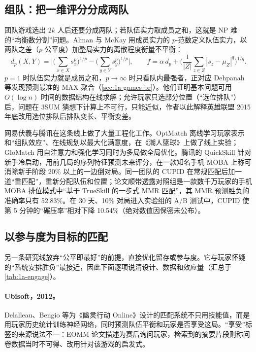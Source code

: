 \subsection{组队：把一维评分分成两队}\label{sec:1a-mm-team}

团队游戏选出 $2k$ 人后还要分成两队；若队伍实力取成员之和，这就是 NP 难的“均衡数分割”问题\cite{wang2024enmatch}\tagLit。Alman 与 McKay 用成员实力的 $p$-范数定义队伍实力，以两队之差（$p$-公平度）加整局实力的离散程度衡量不平衡\cite{alman2017theoretical}\tagLit：
\begin{equation}\label{eq:1a-alman}
  d_p(X,Y)=\Big|\Big(\sum_{x\in X}s_x^p\Big)^{1/p}-\Big(\sum_{y\in Y}s_y^p\Big)^{1/p}\Big|,\qquad
  f=\alpha\,d_p+\Big(\frac{1}{|Z|}\sum_{z\in Z}|s_z-\mu_Z|^q\Big)^{1/q}.
\end{equation}
$p=1$ 时队伍实力就是成员之和，$p\to\infty$ 时只看队内最强者，正对应 Dehpanah 等发现预测最准的 MAX 聚合（\cref{sec:1a-games-br}）。他们证明基本问题可用 $O(\log n)$ 时间的数据结构在线求解；允许玩家只选部分位置（“选位排队”）后，问题在 3SUM 猜想下计算上不可行，只能近似，作者以此解释英雄联盟 2015 年底改用选位排队后排队变长、平衡变差。

网易伏羲与腾讯在这条线上做了大量工程化工作。OptMatch 离线学习玩家表示和“组队效应”、在线规划以最大化满意度，在《潮人篮球》上做了线上实验\cite{gong2020optmatch}\tagLit{}；GloMatch 用自注意力和强化学习同时为多局做全局优化\cite{deng2021globally}\tagLit\needcheck[；只读到其他论文的描述]。腾讯的 QuickSkill 针对新手冷启动，用前几局的序列特征预测未来评分，在一款知名手机 MOBA 上称可消除新手阶段 20\% 以上的一边倒对局\cite{zhang2022quickskill}\tagLit。同一团队的 CUPID 在常规匹配后加一道“重匹配”，重新分配队伍和位置\cite{fan2024cupid}\tagLit；论文顺带透露对照组是一款数千万玩家的手机 MOBA 排位模式中“基于 TrueSkill 的一步式 MMR 匹配”，其 MMR 预测胜负的准确率只有 52.83\%。在 30 天、10\% 对局进入实验组的 A/B 测试中，CUPID 使第 5 分钟的“碾压率”相对下降 10.54\%（绝对数值因保密未公布）。

\subsection{以参与度为目标的匹配}\label{sec:1a-mm-engage}

另一条研究线放弃“公平即最好”的前提，直接优化留存或参与度。它与玩家怀疑的“系统安排胜负”最接近，因此下面逐项说清设计、数据和效应量（汇总于\cref{tab:1a-engage}）。

\paragraph{Ubisoft，2012。}Delalleau、Bengio 等为《幽灵行动 Online》设计的匹配系统不只用技能值，而是用玩家历史统计训练神经网络，同时预测队伍平衡和玩家是否享受这局\cite{delalleau2012beyond}\tagLit。“享受”标签的来源说法不一：EOMM 论文描述为赛后询问玩家，检索到的摘要片段则称问卷数据当时不可得、改用针对该游戏的启发式。


